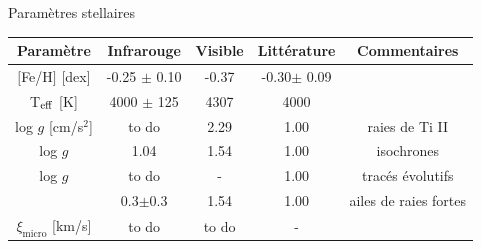 \documentclass[10pt]{beamer}
\begin{document}
\begin{frame}[fragile]{Paramètres stellaires}
    \begin{table}[h!]
        \begin{center}
            \renewcommand{\arraystretch}{1.5}
            \begin{tabular}{c|ccc|c}
                Paramètre & Infrarouge &Visible& Littérature &Commentaires\\
                \hline
                
                $[$Fe/H$]$ [dex]& -0.25 $\pm$ 0.10 & -0.37 &
                -0.30$\pm$ 0.09&\\
                T$_{\rm eff}$ [K] & 4000 $\pm$ 125 &4307 & 4000& \\
    
                log $g$ [cm/s$^2$]& to do & 2.29 & 1.00&raies de Ti II\\
                log $g$ & 1.04 & 1.54 & 1.00 &isochrones\\
                  
                log $g$ & to do & - & 1.00 &tracés évolutifs\\
                \arrayrulecolor{red}\hline
                \multicolumn{1}{|c}{log $g$ }& 0.3$\pm$0.3 & 1.54 & 1.00 &\multicolumn{1}{c|}{ailes de raies fortes}\\
                \arrayrulecolor{red}\hline
                $\xi_{\text{micro}}$ [km/s]& to do & to do & - &\\
            \end{tabular}
        \end{center}
    \end{table}
    \end{frame}
\end{document}
